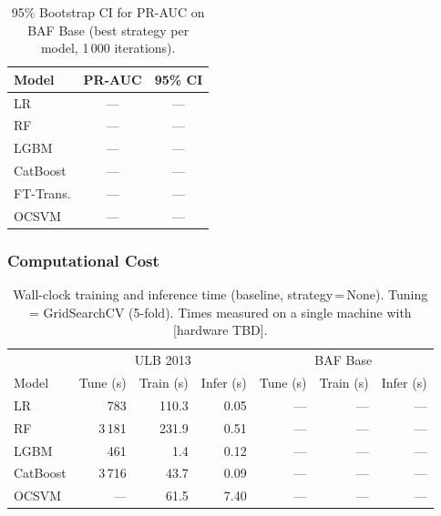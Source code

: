 \begin{table}[ht]
\centering
\caption{95\% Bootstrap CI for PR-AUC on BAF Base (best strategy per model, 1\,000 iterations).}
\label{tab:ci_baf}
\begin{tabular}{l c c}
\toprule
Model & PR-AUC & 95\% CI \\
\midrule
LR        & --- & --- \\
RF        & --- & --- \\
LGBM      & --- & --- \\
CatBoost  & --- & --- \\
FT-Trans. & --- & --- \\
OCSVM     & --- & --- \\
\bottomrule
\end{tabular}
\end{table}

\subsubsection{Computational Cost}

\begin{table}[ht]
\centering
\caption{Wall-clock training and inference time (baseline, strategy\,=\,None).
  Tuning = GridSearchCV (5-fold).
  Times measured on a single machine with [hardware TBD].}
\label{tab:computational_cost}
\begin{tabular}{l r r r r r r}
\toprule
& \multicolumn{3}{c}{ULB 2013} & \multicolumn{3}{c}{BAF Base} \\
Model & Tune (s) & Train (s) & Infer (s) & Tune (s) & Train (s) & Infer (s) \\
\midrule
LR         &    783 & 110.3 & 0.05 &  --- &  --- & --- \\
RF         &  3\,181 & 231.9 & 0.51 &  --- &  --- & --- \\
LGBM       &    461 &   1.4 & 0.12 &  --- &  --- & --- \\
CatBoost   &  3\,716 &  43.7 & 0.09 &  --- &  --- & --- \\
OCSVM      &    --- &  61.5 & 7.40 &  --- &  --- & --- \\
\bottomrule
\end{tabular}
\end{table}



